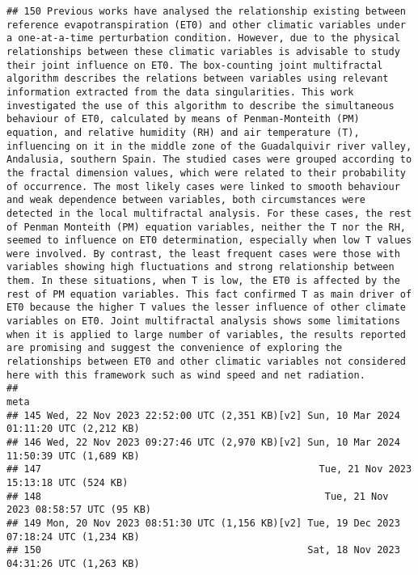\documentclass[
]{article}
\begin{document}
\begin{verbatim}
## 150 Previous works have analysed the relationship existing between reference evapotranspiration (ET0) and other climatic variables under a one-at-a-time perturbation condition. However, due to the physical relationships between these climatic variables is advisable to study their joint influence on ET0. The box-counting joint multifractal algorithm describes the relations between variables using relevant information extracted from the data singularities. This work investigated the use of this algorithm to describe the simultaneous behaviour of ET0, calculated by means of Penman-Monteith (PM) equation, and relative humidity (RH) and air temperature (T), influencing on it in the middle zone of the Guadalquivir river valley, Andalusia, southern Spain. The studied cases were grouped according to the fractal dimension values, which were related to their probability of occurrence. The most likely cases were linked to smooth behaviour and weak dependence between variables, both circumstances were detected in the local multifractal analysis. For these cases, the rest of Penman Monteith (PM) equation variables, neither the T nor the RH, seemed to influence on ET0 determination, especially when low T values were involved. By contrast, the least frequent cases were those with variables showing high fluctuations and strong relationship between them. In these situations, when T is low, the ET0 is affected by the rest of PM equation variables. This fact confirmed T as main driver of ET0 because the higher T values the lesser influence of other climate variables on ET0. Joint multifractal analysis shows some limitations when it is applied to large number of variables, the results reported are promising and suggest the convenience of exploring the relationships between ET0 and other climatic variables not considered here with this framework such as wind speed and net radiation.
##                                                                                      meta
## 145 Wed, 22 Nov 2023 22:52:00 UTC (2,351 KB)[v2] Sun, 10 Mar 2024 01:11:20 UTC (2,212 KB)
## 146 Wed, 22 Nov 2023 09:27:46 UTC (2,970 KB)[v2] Sun, 10 Mar 2024 11:50:39 UTC (1,689 KB)
## 147                                                Tue, 21 Nov 2023 15:13:18 UTC (524 KB)
## 148                                                 Tue, 21 Nov 2023 08:58:57 UTC (95 KB)
## 149 Mon, 20 Nov 2023 08:51:30 UTC (1,156 KB)[v2] Tue, 19 Dec 2023 07:18:24 UTC (1,234 KB)
## 150                                              Sat, 18 Nov 2023 04:31:26 UTC (1,263 KB)
\end{verbatim}
\end{document}
